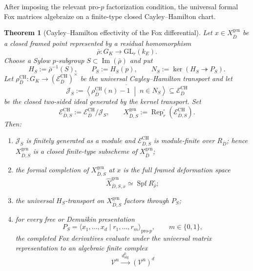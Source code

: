 \documentclass[11pt]{article}
\newtheorem{theorem}{Theorem}[section]
\theoremstyle{definition}
\begin{document}
After imposing the relevant pro-$p$ factorization condition, the universal formal Fox matrices algebraize on a finite-type closed Cayley--Hamilton chart.

\begin{theorem}[Cayley--Hamilton effectivity of the Fox differential]\label{thm:ch-fox-effectivity}
Let $x\in X_{\bar D}^{\mathrm{gen}}$ be a closed framed point represented by a residual homomorphism
\[
 \bar\rho:G_K\longrightarrow\mathrm{GL}_r(k_E).
\]
Choose a Sylow $p$-subgroup $S\subset\operatorname{Im}(\bar\rho)$ and put
\[
 H_S:=\bar\rho^{-1}(S),
 \qquad
 P_S:=H_S(p),
 \qquad
 N_S:=\ker(H_S\twoheadrightarrow P_S).
\]
Let $\rho^{\mathrm{CH}}_{\bar D}:G_K\to(\mathcal E_{\bar D}^{\mathrm{CH}})^\times$ be the universal Cayley--Hamilton transport and let
\begin{equation}\label{eq:pro-p-factorization-ideal}
 \mathcal J_S
 :=
 \overline{\left\langle
 \rho^{\mathrm{CH}}_{\bar D}(n)-1
 \;\middle|\;
 n\in N_S
 \right\rangle}
 \subseteq
 \mathcal E_{\bar D}^{\mathrm{CH}}
\end{equation}
be the closed two-sided ideal generated by the kernel transport.  Set
\[
 \mathcal E_{\bar D,S}^{\mathrm{CH}}
 :=
 \mathcal E_{\bar D}^{\mathrm{CH}}/\mathcal J_S,
 \qquad
 X_{\bar D,S}^{\mathrm{gen}}
 :=
 \operatorname{Rep}^{\square}_r
 (\mathcal E_{\bar D,S}^{\mathrm{CH}}).
\]
Then:
\begin{enumerate}[label=\textnormal{(\roman*)}]
\item $\mathcal J_S$ is finitely generated as a module and
$\mathcal E_{\bar D,S}^{\mathrm{CH}}$ is module-finite over $R_{\bar D}$; hence
$X_{\bar D,S}^{\mathrm{gen}}$ is a closed finite-type subscheme of
$X_{\bar D}^{\mathrm{gen}}$;
\item the formal completion of $X_{\bar D,S}^{\mathrm{gen}}$ at $x$ is the full framed deformation space
\[
 \widehat{X}_{\bar D,S,x}^{\mathrm{gen}}
 \simeq
 \operatorname{Spf}R_{\bar\rho}^{\square};
\]
\item the universal $H_S$-transport on
$X_{\bar D,S}^{\mathrm{gen}}$ factors through $P_S$;
\item for every free or Demu\v{s}kin presentation
\[
 P_S=\langle x_1,\ldots,x_d\mid r_1,\ldots,r_m\rangle_{\mathrm{pro}\text{-}p},
 \qquad m\in\{0,1\},
\]
the completed Fox derivatives evaluate under the universal matrix representation to an algebraic finite complex
\begin{equation}\label{eq:algebraic-ch-fox-complex}
 \mathcal V^{\mathrm u}
 \xrightarrow{\ d^0_{\mathrm{alg}}\ }
 (\mathcal V^{\mathrm u})^d

\end{equation}
\end{enumerate}
\end{theorem}
\end{document}
